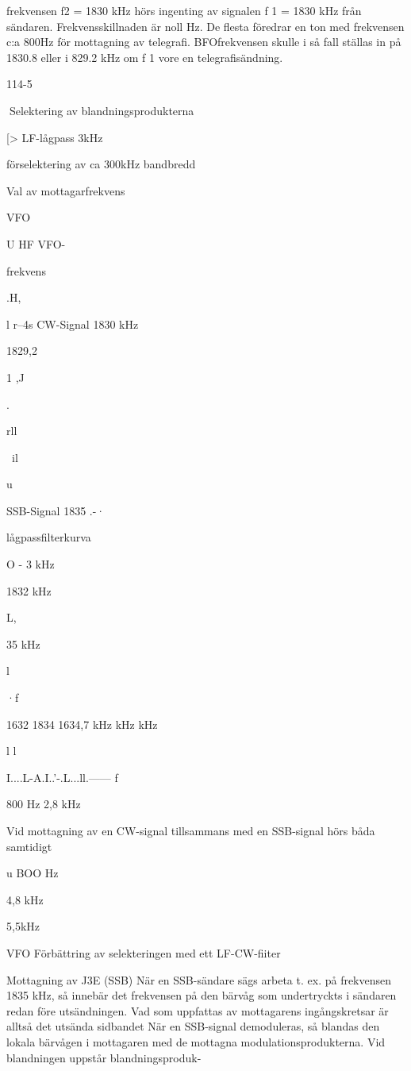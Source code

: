 \documentclass[a4paper,twoside,twocolumn,openright]{book}
\begin{document}
{{{frekvensen f2 = 1830 kHz hörs ingenting av
signalen f 1 = 1830 kHz från sändaren.
Frekvensskillnaden är noll Hz.
De flesta föredrar en ton med frekvensen
c:a 800Hz för mottagning av telegrafi. BFOfrekvensen skulle i så fall ställas in på 1830.8
eller i 829.2 kHz om f 1 vore en telegrafisändning.

114-5

Selektering av blandningsprodukterna

[>
LF-lågpass
3kHz

förselektering
av ca 300kHz
bandbredd

Val av mottagarfrekvens

VFO

U HF
VFO-

frekvens

.H,

l r--4s
CW-Signal
1830 kHz

1829,2

1
,J

.

rll

~il

u

SSB-Signal
1835 .-·

lågpassfilterkurva

O - 3 kHz

1832 kHz

 L,

35 kHz

l

·f

1632 1834 1634,7
kHz kHz kHz

l
l

I....L-A.I..'-.L...ll.------ f

800 Hz 2,8 kHz

Vid mottagning av en CW-signal tillsammans med en SSB-signal hörs båda samtidigt

u
BOO Hz

4,8 kHz

5,5kHz

VFO
Förbättring av selekteringen med ett LF-CW-fiiter

Mottagning av J3E (SSB)
När en SSB-sändare sägs arbeta t. ex. på
frekvensen 1835 kHz, så innebär det frekvensen på den bärvåg som undertryckts i
sändaren redan före utsändningen.
Vad som uppfattas av mottagarens ingångskretsar är alltså det utsända sidbandet När en SSB-signal demoduleras, så
blandas den lokala bärvågen i mottagaren
med de mottagna modulationsprodukterna.
Vid blandningen uppstår blandningsproduk-

}}}
\end{document}
